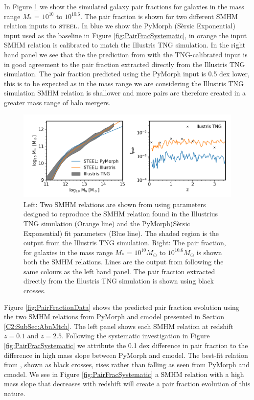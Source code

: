 In Figure \ref{fig:PairFractionIll} we show the simulated galaxy pair fractions for galaxies in the mass range $M_*$ = $10^{10}$ to $10^{10.6}$. The pair fraction is shown for two different SMHM relation inputs to $\textsc{steel}$. In blue we show the PyMorph (S\`ersic Exponential) input used as the baseline in Figure \ref{fig:PairFracSystematic}, in orange the input SMHM relation is calibrated to match the Illustris TNG simulation. In the right hand panel we see that the the prediction from \steel with the TNG-calibrated input is in good agreement to the pair fraction extracted directly from the Illustris TNG simulation. The pair fraction predicted using the PyMorph input is 0.5 dex lower, this is to be expected as in the mass range we are considering the Illustris TNG simulation SMHM relation is shallower and more pairs are therefore created in a greater mass range of halo mergers. 
\begin{figure}
	\centering
	\includegraphics[width = \linewidth]{Figures/Chapter5/PairFractionIllustris.png}
    \caption{Left: Two SMHM relations are shown from \steel using parameters designed to reproduce the SMHM relation found in the Illustrius TNG simulation (Orange line) and the PyMorph(S\`ersic Exponential) fit parameters (Blue line). The shaded region is the output from the Illustris TNG simulation. Right: The pair fraction, for galaxies in the mass range $M_*$ = $10^{10}M_{\odot}$ to $10^{10.6}M_{\odot}$ is shown both the SMHM relations. Lines are the output from \steel following the same colours as the left hand panel. The pair fraction extracted directly from the Illustris TNG simulation is shown using black crosses.}
	\label{fig:PairFractionIll}
\end{figure}

Figure \ref{fig:PairFractionData} shows the predicted pair fraction evolution using the two SMHM relations from PyMorph and cmodel presented in Section \ref{C2:SubSec:AbnMtch}. The left panel shows each SMHM relation at redshift $z = 0.1$ and $z = 2.5$. Following the systematic investigation in Figure \ref{fig:PairFracSystematic} we attribute the 0.1 dex difference in pair fraction to the difference in high mass slope between PyMorph and cmodel. The best-fit relation from \citet{Mundy2017A3.5}, shown as black crosses, rises rather than falling as seen from PyMorph and cmodel. We see in Figure \ref{fig:PairFracSystematic} a SMHM relation with a high mass slope that decreases with redshift will create a pair fraction evolution of this nature.

